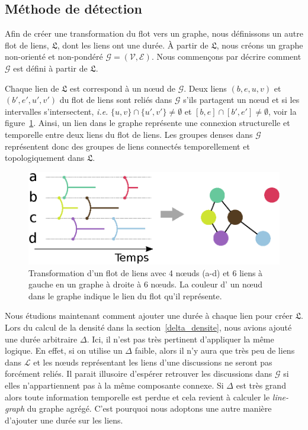 \subsection{Méthode de détection}
\label{sec:fail_mailing}
Afin de créer une transformation du flot vers un graphe, nous définissons un autre flot de liens, $\mathfrak{L}$, dont les liens ont une durée.
\`A partir de $\mathfrak{L}$, nous créons un graphe non-orienté et non-pondéré $\mathcal{G} = (\mathcal{V},\mathcal{E})$. Nous commençons par décrire comment $\mathcal{G}$ est défini à partir de $\mathfrak{L}$.

Chaque lien de $\mathfrak{L}$ est correspond à un n\oe{}ud de $\mathcal{G}$.
Deux liens $(b,e,u,v)$ et $(b',e',u',v')$ du flot de liens sont reliés dans $\mathcal{G}$ s'ils partagent un n\oe{}ud et si les intervalles s'intersectent, \emph{i.e.} $\{u,v\} \cap \{u',v'\} \neq \emptyset$ et $[b,e]\cap[b',e'] \neq \emptyset$, voir la figure~\ref{fig:Transformation}.
Ainsi, un lien dans le graphe représente une connexion structurelle et temporelle entre deux liens du flot de liens.
Les groupes denses dans $\mathcal{G}$ représentent donc des groupes de liens connectés temporellement et topologiquement dans $\mathfrak{L}$.

\begin{figure}
\centering
\includegraphics[width=0.55\linewidth]{img/mailing/Transformation.eps}
\caption{Transformation d'un flot de liens avec 4 n\oe{}uds (a-d) et 6 liens à gauche en un graphe à droite à 6 n\oe{}uds. La couleur d' un n\oe{}ud dans le graphe indique le lien du flot qu'il représente.}
\label{fig:Transformation}
\end{figure}%

Nous étudions maintenant comment ajouter une durée à chaque lien pour créer $\mathfrak{L}$.
Lors du calcul de la densité dans la section~\ref{delta_densite}, nous avions ajouté une durée arbitraire $\Delta$.
Ici, il n'est pas très pertinent d'appliquer la même logique.
En effet, si on utilise un $\Delta$ faible, alors il n'y aura que très peu de liens dans $\mathcal{L}$ et les n\oe{}uds représentant les liens d'une discussions ne seront pas forcément reliés.
Il parait illusoire d'espérer retrouver les discussions dans $\mathcal{G}$ si elles n'appartiennent pas à la même composante connexe.
Si $\Delta$ est très grand alors toute information temporelle est perdue et cela revient à calculer le \emph{line-graph} du graphe agrégé.
C'est pourquoi nous adoptons une autre manière d'ajouter une durée sur les liens.

